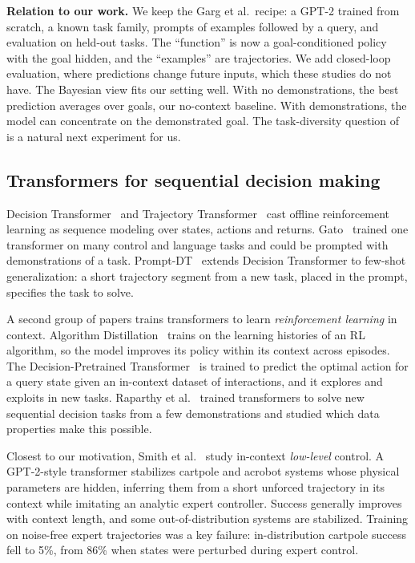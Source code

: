 \textbf{Relation to our work.} We keep the Garg et al.\ recipe: a GPT-2 trained from scratch, a known task family, prompts of
examples followed by a query, and evaluation on held-out tasks. The ``function'' is now a goal-conditioned policy with the goal
hidden, and the ``examples'' are trajectories. We add closed-loop evaluation, where predictions change future inputs, which these
studies do not have. The Bayesian view fits our setting well. With no demonstrations, the best prediction averages over goals,
our no-context baseline. With demonstrations, the model can concentrate on the demonstrated goal. The task-diversity question
of~\cite{raventos2023pretraining} is a natural next experiment for us.

\subsection{Transformers for sequential decision making}
Decision Transformer~\cite{chen2021decision} and Trajectory Transformer~\cite{janner2021offline} cast offline reinforcement learning
as sequence modeling over states, actions and returns. Gato~\cite{reed2022generalist} trained one transformer on many control and
language tasks and could be prompted with demonstrations of a task. Prompt-DT~\cite{xu2022prompting} extends Decision Transformer to
few-shot generalization: a short trajectory segment from a new task, placed in the prompt, specifies the task to solve.

A second group of papers trains transformers to learn \emph{reinforcement learning} in context. Algorithm
Distillation~\cite{laskin2023incontext} trains on the learning histories of an RL algorithm, so the model improves its policy within
its context across episodes. The Decision-Pretrained Transformer~\cite{lee2023supervised} is trained to predict the optimal action
for a query state given an in-context dataset of interactions, and it explores and exploits in new tasks. Raparthy et
al.~\cite{raparthy2023generalization} trained transformers to solve new sequential decision tasks from a few demonstrations and
studied which data properties make this possible.

Closest to our motivation, Smith et al.~\cite{smith2026transformers} study in-context \emph{low-level} control. A GPT-2-style
transformer stabilizes cartpole and acrobot systems whose physical parameters are hidden, inferring them from a short unforced
trajectory in its context while imitating an analytic expert controller. Success generally improves with context length, and some
out-of-distribution systems are stabilized. Training on noise-free expert trajectories was a key failure: in-distribution cartpole
success fell to 5\%, from 86\% when states were perturbed during expert control.

